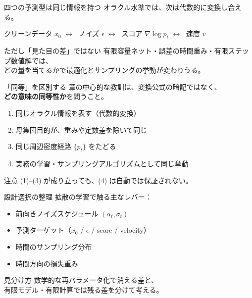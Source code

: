\asmain
\begin{frame}{四つの予測型は同じ情報を持つ}
    オラクル水準では、次は代数的に変換し合える。
    \begin{center}
        クリーンデータ $x_0$
        \;$\leftrightarrow\;$
        ノイズ $\epsilon$
        \;$\leftrightarrow\;$
        スコア $\nabla\log p_t$
        \;$\leftrightarrow\;$
        速度 $v$
    \end{center}
    \begin{alertblock}{ただし「見た目の差」ではない}
        有限容量ネット・誤差の時間重み・有限ステップ数値解では、\\
        どの量を当てるかで最適化とサンプリングの挙動が変わりうる。
    \end{alertblock}
\end{frame}
\asmain
\begin{frame}{「同等」を区別する}
    章の中心的な教訓は、変換公式の暗記ではなく、\\
    \textbf{どの意味の同等性か}を問うこと。
    \begin{enumerate}
        \item 同じオラクル情報を表す（代数的変換）
        \item 母集団目的が、重みや定数差を除いて同じ
        \item 同じ周辺密度経路 $\{p_t\}$ をたどる
        \item 実務の学習・サンプリングアルゴリズムとして同じ挙動
    \end{enumerate}
    \begin{exampleblock}{注意}
        (1)--(3) が成り立っても、(4) は自動では保証されない。
    \end{exampleblock}
\end{frame}
\asmain
\begin{frame}{設計選択の整理}
    拡散の学習で触る主なレバー：
    \begin{itemize}
        \item 前向きノイズスケジュール $(\alpha_t,\sigma_t)$
        \item 予測ターゲット（$x_0$ / $\epsilon$ / score / velocity）
        \item 時間のサンプリング分布
        \item 時間方向の損失重み
    \end{itemize}
    \begin{block}{見分け方}
        数学的な再パラメータ化で消える差と、\\
        有限モデル・有限計算では残る差を分けて考える。
    \end{block}
\end{frame}
